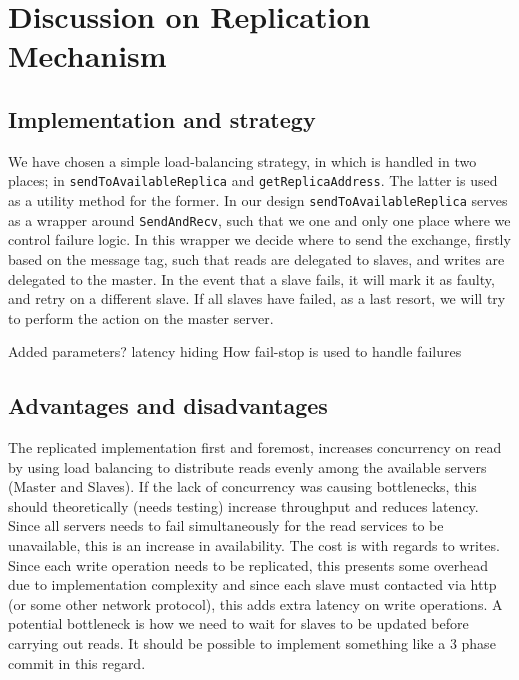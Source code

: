 
\section{Discussion on Replication Mechanism}

\subsection{Implementation and strategy}
We have chosen a simple load-balancing strategy, in which is handled in two
places; in {\tt sendToAvailableReplica} and {\tt getReplicaAddress}. The latter
is used as a utility method for the former. In our design
{\tt sendToAvailableReplica} serves as a wrapper around {\tt SendAndRecv}, such
that we one and only one place where we control failure logic. In this wrapper
we decide where to send the exchange, firstly based on the message tag, such
that reads are delegated to slaves, and writes are delegated to the master. In
the event that a slave fails, it will mark it as faulty, and retry on a different
slave. If all slaves have failed, as a last resort, we will try to perform the
action on the master server.

Added parameters?
latency hiding
How fail-stop is used to handle failures

\subsection{Advantages and disadvantages}
The replicated implementation first and foremost, increases concurrency on
read by using load balancing to distribute reads evenly among the available
servers (Master and Slaves). If the lack of concurrency was causing
bottlenecks, this should theoretically (needs testing) increase throughput and
reduces latency. Since all servers needs to fail simultaneously for the read
services to be unavailable, this is an increase in availability. The cost is
with regards to writes. Since each write operation needs to be replicated,
this presents some overhead due to implementation complexity and since each
slave must contacted via http (or some other network protocol), this adds
extra latency on write operations. A potential bottleneck is how we need to
wait for slaves to be updated before carrying out reads. It should be possible
to implement something like a 3 phase commit in this regard.


